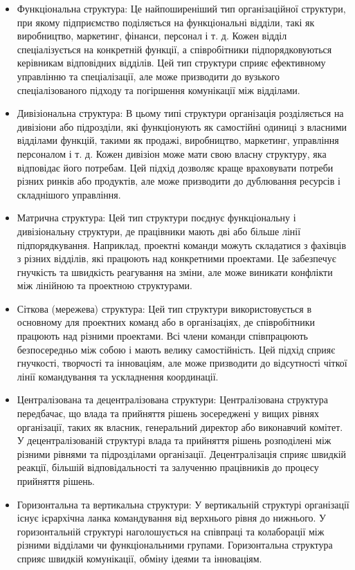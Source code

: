 \documentclass[oneside,14pt]{extarticle}
\begin{document}
\begin{itemize}
	\item Функціональна структура: Це найпоширеніший тип організаційної структури, при якому підприємство поділяється на функціональні відділи, такі як виробництво, маркетинг, фінанси, персонал і т. д. Кожен відділ спеціалізується на конкретній функції, а співробітники підпорядковуються керівникам відповідних відділів. Цей тип структури сприяє ефективному управлінню та спеціалізації, але може призводити до вузького спеціалізованого підходу та погіршення комунікації між відділами.
	\item Дивізіональна структура: В цьому типі структури організація розділяється на дивізіони або підрозділи, які функціонують як самостійні одиниці з власними відділами функцій, такими як продажі, виробництво, маркетинг, управління персоналом і т. д. Кожен дивізіон може мати свою власну структуру, яка відповідає його потребам. Цей підхід дозволяє краще враховувати потреби різних ринків або продуктів, але може призводити до дублювання ресурсів і складнішого управління.
	\item Матрична структура: Цей тип структури поєднує функціональну і дивізіональну структури, де працівники мають дві або більше лінії підпорядкування. Наприклад, проектні команди можуть складатися з фахівців з різних відділів, які працюють над конкретними проектами. Це забезпечує гнучкість та швидкість реагування на зміни, але може виникати конфлікти між лінійною та проектною структурами.
	\item Сіткова (мережева) структура: Цей тип структури використовується в основному для проектних команд або в організаціях, де співробітники працюють над різними проектами. Всі члени команди співпрацюють безпосередньо між собою і мають велику самостійність. Цей підхід сприяє гнучкості, творчості та інноваціям, але може призводити до відсутності чіткої лінії командування та ускладнення координації.
	\item Централізована та децентралізована структури: Централізована структура передбачає, що влада та прийняття рішень зосереджені у вищих рівнях організації, таких як власник, генеральний директор або виконавчий комітет. У децентралізованій структурі влада та прийняття рішень розподілені між різними рівнями та підрозділами організації. Децентралізація сприяє швидкій реакції, більшій відповідальності та залученню працівників до процесу прийняття рішень.
	\item Горизонтальна та вертикальна структури: У вертикальній структурі організації існує ієрархічна ланка командування від верхнього рівня до нижнього. У горизонтальній структурі наголошується на співпраці та колаборації між різними відділами чи функціональними групами. Горизонтальна структура сприяє швидкій комунікації, обміну ідеями та інноваціям.

\end{itemize}
\end{document}
